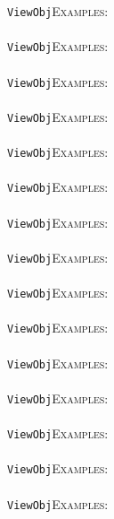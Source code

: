 \documentclass[a4paper,11pt]{report}
\begin{document}
{{ \texttt{ViewObj}{\nobreakspace}{\nobreakspace}{\nobreakspace}{\nobreakspace}\textsc{Examples:} \\
 \\
 \texttt{ViewObj}{\nobreakspace}{\nobreakspace}{\nobreakspace}{\nobreakspace}\textsc{Examples:} \\
 \\
 \texttt{ViewObj}{\nobreakspace}{\nobreakspace}{\nobreakspace}{\nobreakspace}\textsc{Examples:} \\
 \\
 \texttt{ViewObj}{\nobreakspace}{\nobreakspace}{\nobreakspace}{\nobreakspace}\textsc{Examples:} \\
 \\
 \texttt{ViewObj}{\nobreakspace}{\nobreakspace}{\nobreakspace}{\nobreakspace}\textsc{Examples:} \\
 \\
 \texttt{ViewObj}{\nobreakspace}{\nobreakspace}{\nobreakspace}{\nobreakspace}\textsc{Examples:} \\
 \\
 \texttt{ViewObj}{\nobreakspace}{\nobreakspace}{\nobreakspace}{\nobreakspace}\textsc{Examples:} \\
 \\
 \texttt{ViewObj}{\nobreakspace}{\nobreakspace}{\nobreakspace}{\nobreakspace}\textsc{Examples:} \\
 \\
 \texttt{ViewObj}{\nobreakspace}{\nobreakspace}{\nobreakspace}{\nobreakspace}\textsc{Examples:} \\
 \\
 \texttt{ViewObj}{\nobreakspace}{\nobreakspace}{\nobreakspace}{\nobreakspace}\textsc{Examples:} \\
 \\
 \texttt{ViewObj}{\nobreakspace}{\nobreakspace}{\nobreakspace}{\nobreakspace}\textsc{Examples:} \\
 \\
 \texttt{ViewObj}{\nobreakspace}{\nobreakspace}{\nobreakspace}{\nobreakspace}\textsc{Examples:} \\
 \\
 \texttt{ViewObj}{\nobreakspace}{\nobreakspace}{\nobreakspace}{\nobreakspace}\textsc{Examples:} \\
 \\
 \texttt{ViewObj}{\nobreakspace}{\nobreakspace}{\nobreakspace}{\nobreakspace}\textsc{Examples:} \\
 \\
 \texttt{ViewObj}{\nobreakspace}{\nobreakspace}{\nobreakspace}{\nobreakspace}\textsc{Examples:} \\
}}
\end{document}
